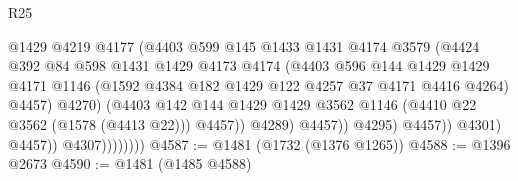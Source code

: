\begin{lexlean}{R25}
\begin{coremodule}
                                      @1429
                                      @4219
                                      @4177
                                      (@4403
                                        @599
                                        @145
                                        @1433
                                        @1431
                                        @4174
                                        @3579
                                        (@4424
                                          @392
                                          @84
                                          @598
                                          @1431
                                          @1429
                                          @4173
                                          @4174
                                          (@4403
                                            @596
                                            @144
                                            @1429
                                            @1429
                                            @4171
                                            @1146
                                            (@1592
                                              @4384
                                              @182
                                              @1429
                                              @122
                                              @4257
                                              @37
                                              @4171
                                              @4416
                                              @4264)
                                            @4457)
                                          @4270)
                                        (@4403
                                          @142
                                          @144
                                          @1429
                                          @1429
                                          @3562
                                          @1146
                                          (@4410 @22 @3562 (@1578 (@4413 @22)))
                                          @4457))
                                      @4289)
                                    @4457))
                                @4295)
                              @4457))
                          @4301)
                        @4457))
                    @4307))))))))
@4587 := @1481 (@1732 (@1376 @1265))
@4588 := @1396 @2673
@4590 := @1481 (@1485 @4588)

\end{coremodule}
\end{lexlean}
